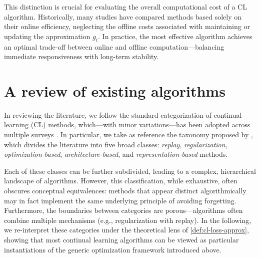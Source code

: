 \documentclass[10pt]{article} %
\begin{document}
This distinction is crucial for evaluating the overall computational cost of a CL algorithm.  
Historically, many studies have compared methods based solely on their online efficiency, neglecting the offline costs associated with maintaining or updating the approximation $g_t$.  
In practice, the most effective algorithm achieves an optimal trade-off between online and offline computation—balancing immediate responsiveness with long-term stability.


\section{A review of existing algorithms}
\label{sec:review}

%

In reviewing the literature, we follow the standard categorization of continual learning (CL) methods, which—with minor variations—has been adopted across multiple surveys \citep{parisiContinualLifelongLearning2019,delangeContinualLearningSurvey2022}.  
In particular, we take as reference the taxonomy proposed by \citet{wangComprehensiveSurveyContinual2024a}, which divides the literature into five broad classes:  
\emph{replay}, \emph{regularization}, \emph{optimization-based}, \emph{architecture-based}, and \emph{representation-based} methods.  

Each of these classes can be further subdivided, leading to a complex, hierarchical landscape of algorithms.  
However, this classification, while exhaustive, often obscures conceptual equivalences:  
methods that appear distinct algorithmically may in fact implement the same underlying principle of avoiding forgetting.  
Furthermore, the boundaries between categories are porous—algorithms often combine multiple mechanisms (e.g., regularization with replay).  
In the following, we re-interpret these categories under the theoretical lens of \cref{def:cl-loss-approx}, showing that most continual learning algorithms can be viewed as particular instantiations of the generic optimization framework introduced above.
\end{document}

